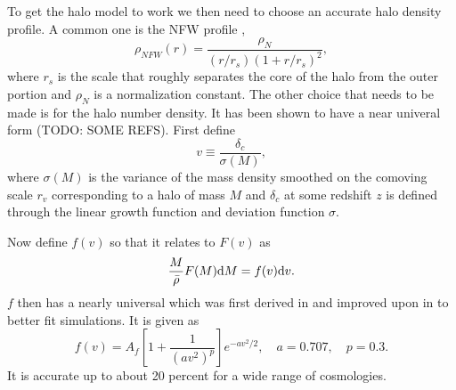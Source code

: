 \documentclass[11pt]{book}
\DeclareRobustCommand{\d}{\ifmmode\text{d}\else d\fi}
\newcommand{\sbr}[1]{\ensuremath{\left[ #1 \right]}}
\begin{document}
To get the halo model to work we then need to choose an accurate halo density profile. A common one is the NFW profile \cite{Navarro_1997},
\begin{equation}
    \rho_{NFW}(r) = \frac{\rho_N}{(r/r_s)(1+r/r_s)^2},
\end{equation}
where $r_s$ is the scale that roughly separates the core of the halo from the outer portion and $\rho_N$ is a normalization constant. The other choice that needs to be made is for the halo number density. It has been shown to have a near univeral form (TODO: SOME REFS). First define
\begin{equation}
    v \equiv \frac{\delta_c}{\sigma(M)},
\end{equation}
where $\sigma(M)$ is the variance of the mass density smoothed on the comoving scale $r_v$ corresponding to a halo of mass $M$ and $\delta_c$ at some redshift $z$ is defined through the linear growth function and deviation function $\sigma$.

Now define $f(v)$ so that it relates to $F(v)$ as 
\begin{equation}
    \frac{M}{\bar \rho}F(M)\d M = f(v) \d v.
\end{equation}
$f$ then has a nearly universal which was first derived in \cite{1974ApJ...187..425P} and improved upon in \cite{Sheth_1999} to better fit simulations. It is given as
\begin{equation}
    f(v) = A_f\sbr{1+\frac{1}{(av^2)^p}}e^{-av^2/2}, \quad a = 0.707, \quad p = 0.3.
\end{equation}
It is accurate up to about 20 percent for a wide range of cosmologies.
\end{document}

